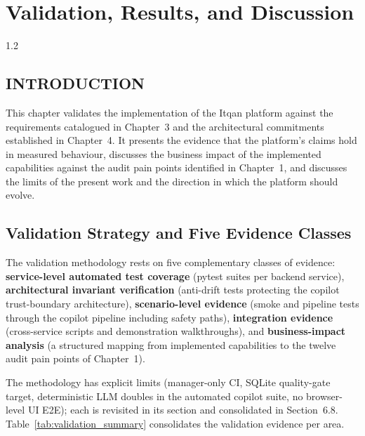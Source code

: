 \chapter{Validation, Results, and Discussion}
\begin{spacing}{1.2}
\minitoc
\thispagestyle{MyStyle}
\end{spacing}
\newpage

\section*{INTRODUCTION}
This chapter validates the implementation of the Itqan platform against the requirements catalogued in Chapter~3 and the architectural commitments established in Chapter~4. It presents the evidence that the platform's claims hold in measured behaviour, discusses the business impact of the implemented capabilities against the audit pain points identified in Chapter~1, and discusses the limits of the present work and the direction in which the platform should evolve.

\section{Validation Strategy and Five Evidence Classes}
The validation methodology rests on five complementary classes of evidence: \textbf{service-level automated test coverage} (pytest suites per backend service), \textbf{architectural invariant verification} (anti-drift tests protecting the copilot trust-boundary architecture), \textbf{scenario-level evidence} (smoke and pipeline tests through the copilot pipeline including safety paths), \textbf{integration evidence} (cross-service scripts and demonstration walkthroughs), and \textbf{business-impact analysis} (a structured mapping from implemented capabilities to the twelve audit pain points of Chapter~1).

The methodology has explicit limits (manager-only CI, SQLite quality-gate target, deterministic LLM doubles in the automated copilot suite, no browser-level UI E2E); each is revisited in its section and consolidated in Section~6.8. Table~\ref{tab:validation_summary} consolidates the validation evidence per area.


